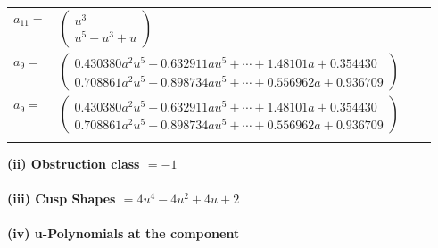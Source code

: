 \documentclass[1p]{elsarticle_modified}
\theoremstyle{definition}
\begin{document}
\begin{tabular}{m{7pt} m{180pt} m{7pt} m{180pt} }
\flushright $a_{11}=$&$\begin{pmatrix}u^3\\u^5- u^3+u\end{pmatrix}$ \\
\flushright $a_{9}=$&$\begin{pmatrix}0.430380 a^{2} u^{5}-0.632911 a u^{5}+\cdots+1.48101 a+0.354430\\0.708861 a^{2} u^{5}+0.898734 a u^{5}+\cdots+0.556962 a+0.936709\end{pmatrix}$\\ \flushright $a_{9}=$&$\begin{pmatrix}0.430380 a^{2} u^{5}-0.632911 a u^{5}+\cdots+1.48101 a+0.354430\\0.708861 a^{2} u^{5}+0.898734 a u^{5}+\cdots+0.556962 a+0.936709\end{pmatrix}$\\&\end{tabular}
\flushleft \textbf{(ii) Obstruction class $= -1$}\\~\\
\flushleft \textbf{(iii) Cusp Shapes $= 4 u^4-4 u^2+4 u+2$}\\~\\
\newpage\renewcommand{\arraystretch}{1}
\flushleft \textbf{(iv) u-Polynomials at the component}\newline \\
\end{document}
